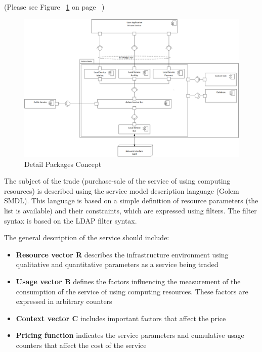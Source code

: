 

(Please see Figure ~\ref{fig:DPC} on page ~\pageref{fig:DPC})

\begin{figure}[H]
    \centering
    \includegraphics[width=14cm,angle=0]{./diag/Abstract/DetailPackage-Abstract.png}
	\caption{Detail Packages Concept}
    \label{fig:DPC}
\end{figure}


\newpage

The subject of the trade (purchase-sale of the service of using computing resources)
is described using the service model description language (Golem SMDL).
This language is based on a simple definition of resource parameters (the list is available) and their constraints, which are expressed using filters.
The filter syntax is based on the LDAP filter syntax.

The general description of the service should include:

\begin{itemize}
\item {\bf Resource vector R} describes the infrastructure environment using qualitative and quantitative parameters as a service being traded
\item {\bf Usage vector B} defines the factors influencing the measurement of the consumption of the service of using computing resources. These factors are expressed in arbitrary counters
\item {\bf Context vector C} includes important factors that affect the price
\item {\bf Pricing function} indicates the service parameters and cumulative usage counters that affect the cost of the service
\end{itemize}

